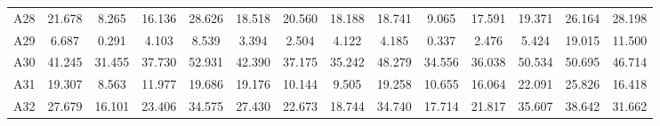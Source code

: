 \begin{tabular}{cccccccccccccc}
     A28   &  21.678  &   8.265  &  16.136  &  28.626  &  18.518  &  20.560  &  18.188  &  18.741  &   9.065  &  17.591  &  19.371  &  26.164  &  28.198 \\ 
     A29   &   6.687  &   0.291  &   4.103  &   8.539  &   3.394  &   2.504  &   4.122  &   4.185  &   0.337  &   2.476  &   5.424  &  19.015  &  11.500 \\ 
     A30   &  41.245  &  31.455  &  37.730  &  52.931  &  42.390  &  37.175  &  35.242  &  48.279  &  34.556  &  36.038  &  50.534  &  50.695  &  46.714 \\ 
     A31   &  19.307  &   8.563  &  11.977  &  19.686  &  19.176  &  10.144  &   9.505  &  19.258  &  10.655  &  16.064  &  22.091  &  25.826  &  16.418 \\ 
     A32   &  27.679  &  16.101  &  23.406  &  34.575  &  27.430  &  22.673  &  18.744  &  34.740  &  17.714  &  21.817  &  35.607  &  38.642  &  31.662 \\ 
    \bottomrule
    \end{tabular}